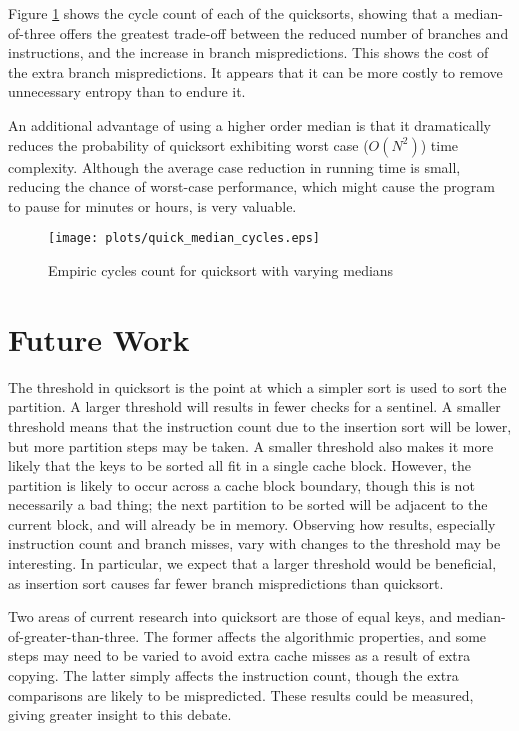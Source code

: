 Figure \ref{quick_median_cycles} shows the cycle count of each of the
quicksorts, showing that a median-of-three offers the greatest trade-off
between the reduced number of branches and instructions, and the increase in
branch mispredictions. This shows the cost of the extra branch mispredictions.
It appears that it can be more costly to remove unnecessary entropy than to
endure it.

An additional advantage of using a higher order median is that it dramatically
reduces the probability of quicksort exhibiting worst case ($O(N^2)$) time
complexity. Although the average case reduction in running time is small,
reducing the chance of worst-case performance, which might cause the program to
pause for minutes or hours, is very valuable.

\begin{figure}
\texttt{[image: plots/quick\_median\_cycles.eps]}
\caption{Empiric cycles count for quicksort with varying medians}
\label{quick_median_cycles}
\end{figure}


\section{Future Work}
The threshold in quicksort is the point at which a simpler sort is used to sort
the partition. A larger threshold will results in fewer checks for a sentinel. A
smaller threshold means that the instruction count due to the insertion sort
will be lower, but more partition steps may be taken. A smaller threshold also
makes it more likely that the keys to be sorted all fit in a single cache
block. However, the partition is likely to occur across a cache block boundary,
though this is not necessarily a bad thing; the next partition to be sorted will
be adjacent to the current block, and will already be in memory. Observing how
results, especially instruction count and branch misses, vary with changes 
to the threshold may be interesting. In particular, we expect that a larger
threshold would be beneficial, as insertion sort causes far fewer branch
mispredictions than quicksort.

Two areas of current research into quicksort are those of equal keys, and
median-of-greater-than-three. The former affects the algorithmic properties, and
some steps may need to be varied to avoid extra cache misses as a result
of extra copying. The latter simply affects the instruction count, though the
extra comparisons are likely to be mispredicted. These results could be
measured, giving greater insight to this debate.

